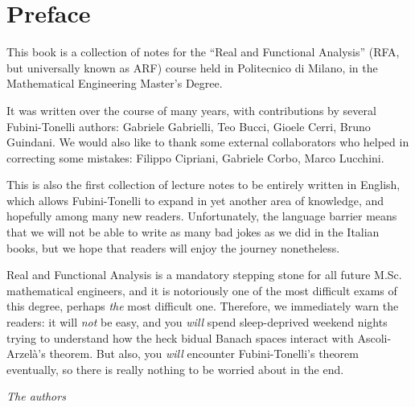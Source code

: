 \section*{Preface}

This book is a collection of notes for the ``Real and Functional Analysis'' (RFA, but universally known as ARF) course held in Politecnico di Milano, in the Mathematical Engineering Master's Degree.

It was written over the course of many years, with contributions by several Fubini-Tonelli authors: Gabriele Gabrielli, Teo Bucci, Gioele Cerri, Bruno Guindani.
We would also like to thank some external collaborators who helped in correcting some mistakes: Filippo Cipriani, Gabriele Corbo, Marco Lucchini.

This is also the first collection of lecture notes to be entirely written in English, which allows Fubini-Tonelli to expand in yet another area of knowledge, and hopefully among many new readers.
Unfortunately, the language barrier means that we will not be able to write as many bad jokes as we did in the Italian books, but we hope that readers will enjoy the journey nonetheless.

Real and Functional Analysis is a mandatory stepping stone for all future M.Sc. mathematical engineers, and it is notoriously one of the most difficult exams of this degree, perhaps \textit{the} most difficult one.
Therefore, we immediately warn the readers: it will \textit{not} be easy, and you \textit{will} spend sleep-deprived weekend nights trying to understand how the heck bidual Banach spaces interact with Ascoli-Arzelà's theorem.
But also, you \textit{will} encounter Fubini-Tonelli's theorem eventually, so there is really nothing to be worried about in the end.

\begin{flushright}
	\textit{The authors}\hspace*{0.5cm}
\end{flushright}